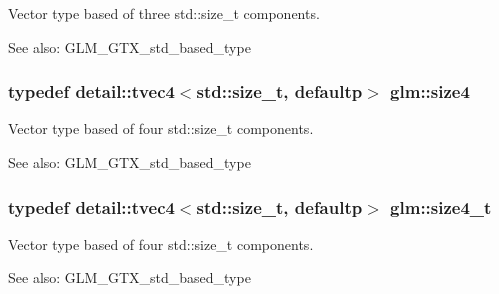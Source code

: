 Vector type based of three std::size\_\-t components. \begin{Desc}
\item[See also:]GLM\_\-GTX\_\-std\_\-based\_\-type \end{Desc}
\hypertarget{group__gtx__std__based__type_gc04a40cfe44b5035770cf26d98a9349d}{
\subsubsection[size4]{\setlength{\rightskip}{0pt plus 5cm}typedef detail::tvec4$<$std::size\_\-t, defaultp$>$ {\bf glm::size4}}}
\label{group__gtx__std__based__type_gc04a40cfe44b5035770cf26d98a9349d}


Vector type based of four std::size\_\-t components. \begin{Desc}
\item[See also:]GLM\_\-GTX\_\-std\_\-based\_\-type \end{Desc}
\hypertarget{group__gtx__std__based__type_gaaf9b6a73135945e356601a01beece30}{
\subsubsection[size4\_\-t]{\setlength{\rightskip}{0pt plus 5cm}typedef detail::tvec4$<$std::size\_\-t, defaultp$>$ {\bf glm::size4\_\-t}}}
\label{group__gtx__std__based__type_gaaf9b6a73135945e356601a01beece30}


Vector type based of four std::size\_\-t components. \begin{Desc}
\item[See also:]GLM\_\-GTX\_\-std\_\-based\_\-type \end{Desc}
